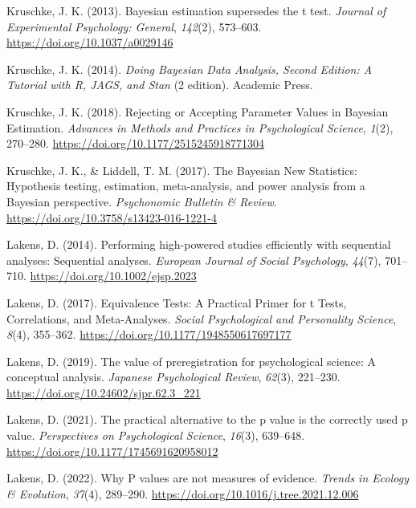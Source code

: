 \documentclass[
  letterpaper,
  DIV=11,
  numbers=noendperiod]{scrreprt}
\newlength{\cslhangindent}
\newlength{\cslentryspacingunit} %
\newenvironment{CSLReferences}[2] %
 {%
  \setlength{\parindent}{0pt}
  \ifodd #1
  \let\oldpar\par
  \def\par{\hangindent=\cslhangindent\oldpar}
  \fi
  \setlength{\parskip}{#2\cslentryspacingunit}
 }%
 {}
\begin{document}
\begin{CSLReferences}{1}{0}
\leavevmode{}%
Kruschke, J. K. (2013). Bayesian estimation supersedes the t test.
\emph{Journal of Experimental Psychology: General}, \emph{142}(2),
573--603. \url{https://doi.org/10.1037/a0029146}

\leavevmode{}%
Kruschke, J. K. (2014). \emph{Doing {Bayesian Data Analysis}, {Second
Edition}: {A Tutorial} with {R}, {JAGS}, and {Stan}} (2 edition).
{Academic Press}.

\leavevmode{}%
Kruschke, J. K. (2018). Rejecting or {Accepting Parameter Values} in
{Bayesian Estimation}. \emph{Advances in Methods and Practices in
Psychological Science}, \emph{1}(2), 270--280.
\url{https://doi.org/10.1177/2515245918771304}

\leavevmode{}%
Kruschke, J. K., \& Liddell, T. M. (2017). The {Bayesian New
Statistics}: {Hypothesis} testing, estimation, meta-analysis, and power
analysis from a {Bayesian} perspective. \emph{Psychonomic Bulletin \&
Review}. \url{https://doi.org/10.3758/s13423-016-1221-4}

\leavevmode{}%
Lakens, D. (2014). Performing high-powered studies efficiently with
sequential analyses: {Sequential} analyses. \emph{European Journal of
Social Psychology}, \emph{44}(7), 701--710.
\url{https://doi.org/10.1002/ejsp.2023}

\leavevmode{}%
Lakens, D. (2017). Equivalence {Tests}: {A Practical Primer} for t
{Tests}, {Correlations}, and {Meta-Analyses}. \emph{Social Psychological
and Personality Science}, \emph{8}(4), 355--362.
\url{https://doi.org/10.1177/1948550617697177}

\leavevmode{}%
Lakens, D. (2019). The value of preregistration for psychological
science: {A} conceptual analysis. \emph{Japanese Psychological Review},
\emph{62}(3), 221--230. \url{https://doi.org/10.24602/sjpr.62.3_221}

\leavevmode{}%
Lakens, D. (2021). The practical alternative to the p value is the
correctly used p value. \emph{Perspectives on Psychological Science},
\emph{16}(3), 639--648. \url{https://doi.org/10.1177/1745691620958012}

\leavevmode{}%
Lakens, D. (2022). Why {P} values are not measures of evidence.
\emph{Trends in Ecology \& Evolution}, \emph{37}(4), 289--290.
\url{https://doi.org/10.1016/j.tree.2021.12.006}


\end{CSLReferences}
\end{document}
